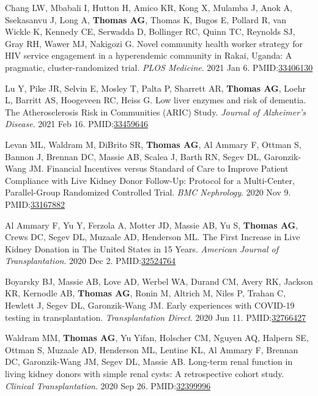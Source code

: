 \documentclass[10pt]{article}
\makeatletter
\newlength{\bibhang}
\newlength{\bibsep}
 {\@listi \global\bibsep\itemsep \global\advance\bibsep by\parsep}
\newenvironment{bibenum*}
  {\renewcommand\labelenumi{[\theenumi]}%
   \etaremune[
     topsep=0pt,
     itemsep=\bibsep,
     parsep=0pt,partopsep=0pt,
     itemindent=-\bibhang,
     leftmargin={\bibhang+\widthof{[999]}}]}
  {\endetaremune}
\newcommand{\pmid}[1]{PMID:\href{https://www.ncbi.nlm.nih.gov/pubmed/#1}{#1}}
\makeatother
\begin{document}
\begin{bibenum*}
\item Chang LW, Mbabali I, Hutton H, Amico KR, Kong X, 
  Mulamba J, Anok A, Ssekasanvu J, Long A, \textbf{Thomas AG},
  Thomas K, Bugos E, Pollard R, van Wickle K, Kennedy CE,
  Serwadda D, Bollinger RC, Quinn TC, Reynolds SJ, Gray RH,
  Wawer MJ, Nakigozi G.
  Novel community health worker strategy for HIV service 
  engagement in a hyperendemic community in Rakai, Uganda: 
  A pragmatic, cluster-randomized trial.
  \emph{PLOS Medicine}. 2021 Jan 6.
  \pmid{33406130} 

\item Lu Y, Pike JR, Selvin E, Mosley T, Palta P, Sharrett AR, 
  \textbf{Thomas AG},
  Loehr L, Barritt AS, Hoogeveen RC, Heiss G. 
  Low liver enzymes and risk of dementia. 
  The Atherosclerosis Risk in Communities (ARIC) Study.
  \emph{Journal of Alzheimer's Disease}. 2021 Feb 16.
  \pmid{33459646} 

\item Levan ML, Waldram M,  DiBrito SR, \textbf{Thomas AG}, Al Ammary F,
  Ottman S, Bannon J, Brennan DC, Massie AB, Scalea J, Barth RN, Segev DL,
  Garonzik-Wang JM.
  Financial Incentives versus Standard of Care to Improve Patient Compliance
  with Live Kidney Donor Follow-Up: Protocol for a Multi-Center,
  Parallel-Group Randomized Controlled Trial.
  \emph{BMC Nephrology}. 2020 Nov 9.
  \pmid{33167882} 

\item Al Ammary F, Yu Y, Ferzola A, Motter JD, Massie AB, Yu S,
  \textbf{Thomas AG}, Crews DC, Segev DL, Muzaale AD, Henderson ML.
  The First Increase in Live Kidney Donation in The United States
  in 15 Years.
  \emph{American Journal of Transplantation}. 2020 Dec 2.
  \pmid{32524764} 

\item Boyarsky BJ, Massie AB, Love AD, Werbel WA, Durand CM, Avery RK,
  Jackson KR, Kernodle AB, \textbf{Thomas AG}, Ronin M,
  Altrich M, Niles P, Trahan C, Hewlett J, Segev DL, Garonzik-Wang JM.
  Early experiences with COVID-19 testing in transplantation.
  \emph{Transplantation Direct}. 2020 Jun 11.
  \pmid{32766427} 

\item Waldram MM\dag, \textbf{Thomas AG\dag}, Yu Yifan, Holscher CM,
  Nguyen AQ, Halpern SE, Ottman S, Muzaale AD, Henderson ML, Lentine KL,
  Al Ammary F, Brennan DC, Garonzik-Wang JM, Segev DL, Massie AB.
  Long-term renal function in living kidney donors with simple renal cysts:
  A retrospective cohort study.
  \emph{Clinical Transplantation}. 2020 Sep 26.
  \pmid{32399996} 


\end{bibenum*}
\end{document}
